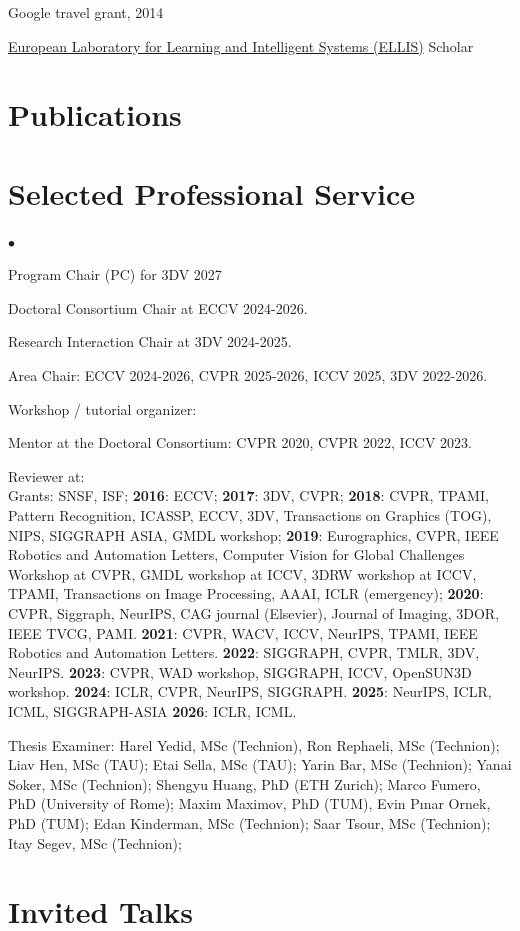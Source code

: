 \documentclass[margin,line]{res}
\newenvironment{list2}{
  \begin{list}{$\bullet$}{%
      \setlength{\itemsep}{0in}
      \setlength{\parsep}{0in} \setlength{\parskip}{0in}
      \setlength{\topsep}{0in} \setlength{\partopsep}{0in}
      \setlength{\leftmargin}{0.2in}}}{\end{list}}
\begin{document}
\begin{resume}
\vspace*{-2.5mm}
Google travel grant, 2014

\vspace*{-2.5mm}
\href{https://ellis.eu/}{European Laboratory for Learning and Intelligent Systems (ELLIS)} Scholar

\section{\sc Publications}




\section{\sc Selected Professional Service}

\begin{list2}
\item Program Chair (PC) for 3DV 2027
\item Doctoral Consortium Chair at ECCV 2024-2026. 
\item Research Interaction Chair at 3DV 2024-2025.
\item Area Chair: ECCV 2024-2026, CVPR 2025-2026, ICCV 2025, 3DV 2022-2026.
\item Workshop / tutorial organizer:

\item Mentor at the Doctoral Consortium: CVPR 2020, CVPR 2022, ICCV 2023. 
\item Reviewer at: \\
Grants: SNSF, ISF; \textbf{2016}: ECCV; \textbf{2017}: 3DV, CVPR; \textbf{2018}: CVPR, TPAMI, Pattern Recognition, ICASSP, ECCV, 3DV, Transactions on Graphics (TOG), NIPS, SIGGRAPH ASIA, GMDL workshop; \textbf{2019}:  Eurographics, CVPR, IEEE Robotics and Automation Letters, Computer Vision for Global Challenges Workshop at CVPR, GMDL workshop at ICCV, 3DRW workshop at ICCV, TPAMI, Transactions on Image Processing, AAAI, ICLR (emergency); \textbf{2020}: CVPR, Siggraph, NeurIPS, CAG journal (Elsevier), Journal of Imaging, 3DOR, IEEE TVCG, PAMI. \textbf{2021}: CVPR, WACV, ICCV, NeurIPS, TPAMI, IEEE  Robotics  and  Automation  Letters. \textbf{2022}: SIGGRAPH, CVPR, TMLR, 3DV, NeurIPS. \textbf{2023}: CVPR, WAD workshop, SIGGRAPH, ICCV, OpenSUN3D workshop. \textbf{2024}: ICLR, CVPR, NeurIPS, SIGGRAPH. \textbf{2025}: NeurIPS, ICLR, ICML, SIGGRAPH-ASIA \textbf{2026}: ICLR, ICML. 
\item Thesis Examiner: Harel Yedid, MSc (Technion), Ron Rephaeli, MSc (Technion); Liav Hen, MSc (TAU); Etai Sella, MSc (TAU); Yarin Bar, MSc (Technion); Yanai Soker, MSc (Technion); Shengyu Huang, PhD (ETH Zurich);  Marco Fumero, PhD (University of Rome); Maxim Maximov, PhD (TUM), Evin Pınar Ornek, PhD (TUM); Edan Kinderman, MSc (Technion); Saar Tsour, MSc (Technion); Itay Segev, MSc (Technion); 
\end{list2}

\section{\sc Invited Talks}


\end{resume}
\end{document}

